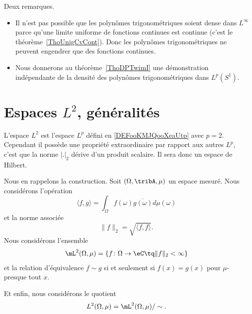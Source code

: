 \begin{remark}
	Deux remarques.
	\begin{itemize}
		\item
		      Il n'est pas possible que les polynômes trigonométriques soient dense dans \( L^{\infty}\) parce qu'une limite uniforme de fonctions continues est continue (c'est le théorème~\ref{ThoUnigCvCont}). Donc les polynômes trigonométriques ne peuvent engendrer que des fonctions continues.
		\item
		      Nous donnerons au théorème~\ref{ThoDPTwimI} une démonstration indépendante de la densité des polynômes trigonométriques dans \( L^p(S^1)\).
	\end{itemize}
\end{remark}



\section{Espaces \texorpdfstring{\( L^2\)}{\( L^2\)}, généralités}
\label{SECooEVZSooLtLhUm}

L'espace \( L^2\) est l'espace \( L^p\) défini en \ref{DEFooKMJQooXeaUtp} avec \( p=2\). Cependant il possède une propriété extraordinaire par rapport aux autres \( L^p\), c'est que la norme \( | . |_2\) dérive d'un produit scalaire. Il sera donc un espace de Hilbert.

\begin{normaltext}  \label{NORMooUEIEooYtlFse}
	Nous en rappelons la construction. Soit \( (\Omega,\tribA,\mu)\) un espace mesuré. Nous considérons l'opération
	\begin{equation}    \label{DefProdScalLubrgTj}
		\langle f, g\rangle =\int_{\Omega}f(\omega)\overline{ g(\omega)}d\mu(\omega)
	\end{equation}
	et la norme associée
	\begin{equation}
		\| f \|_2=\sqrt{\langle f, f\rangle }.
	\end{equation}
	Nous considérons l'ensemble
	\begin{equation}
		\mL^2(\Omega,\mu)=\{ f\colon \Omega\to \eC\tq \| f \|_2<\infty \}
	\end{equation}
	et la relation d'équivalence \( f\sim g\) si et seulement si \( f(x)=g(x)\) pour \( \mu\)-presque tout \( x\).

	Et enfin, nous considérons le quotient
	\begin{equation}
		L^2(\Omega,\mu)=\mL^2(\Omega,\mu)/\sim.
	\end{equation}
\end{normaltext}


